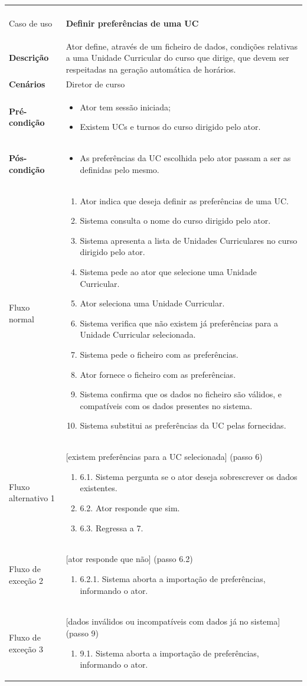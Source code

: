 \documentclass[12pt, a4paper]{article}
\newenvironment{condition}{
    \begin{itemize}[wide=0pt]
        \vspace{-0.2cm}
}{
        \vspace{-0.5cm}
    \end{itemize}
}
\newcommand\flow[1]{
    Fluxo normal &
    \vspace{-0.9cm}
    \singlespacing
    \begin{enumerate}[wide=0pt]
        #1
        \vspace{-0.3cm}
    \end{enumerate} \\ \hline
}
\newcommand\otherflow[3]{
    #1 &
    #2
    \singlespacing
    \begin{enumerate}[wide=0pt]
        #3
        \vspace{-0.3cm}
    \end{enumerate} \\ \hline
}
\newenvironment{usecase}[5]{
    \begin{longtable}{|>{\centering\arraybackslash\bf}m{3cm}|m{13cm}|}
        \multicolumn{2}{c}{\ldots Continua \ldots} \\
        \endfoot
        \endlastfoot

        \hline
        Caso de uso & \textbf{#1} \\

        \hline
        Descrição & #2 \\

        \hline
        Cenários & #3 \\

        \hline
        Pré-condição &
        \vspace{-0.8cm}
        \begin{condition}
            #4
        \end{condition} \\

        \hline
        Pós-condição &
        \vspace{-0.8cm}
        \begin{condition}
            #5
        \end{condition} \\

        \hline
}{
\end{longtable}
}
\begin{document}
\begin{usecase}
    {Definir preferências de uma UC}
    {
        Ator define, através de um ficheiro de dados, condições relativas a uma Unidade Curricular
        do curso que dirige, que devem ser respeitadas na geração automática de horários.
    }
    {Diretor de curso}
    {
        \item Ator tem sessão iniciada;
        \item Existem UCs e turnos do curso dirigido pelo ator.
    }
    {\item As preferências da UC escolhida pelo ator passam a ser as definidas pelo mesmo.}

    \flow{
        \item Ator indica que deseja definir as preferências de uma UC.
        \item Sistema consulta o nome do curso dirigido pelo ator.
        \item Sistema apresenta a lista de Unidades Curriculares no curso dirigido pelo ator.
        \item Sistema pede ao ator que selecione uma Unidade Curricular.
        \item Ator seleciona uma Unidade Curricular.
        \item Sistema verifica que não existem já preferências para a Unidade Curricular
            selecionada.
        \item Sistema pede o ficheiro com as preferências.
        \item Ator fornece o ficheiro com as preferências.
        \item Sistema confirma que os dados no ficheiro são válidos, e compatíveis com os dados
            presentes no sistema.
        \item Sistema substitui as preferências da UC pelas fornecidas.
    }

    \otherflow{Fluxo alternativo 1}{[existem preferências para a UC selecionada] (passo 6)}{
        \item[6.1.] Sistema pergunta se o ator deseja sobrescrever os dados existentes.
        \item[6.2.] Ator responde que sim.
        \item[6.3.] Regressa a 7.
    }

    \otherflow{Fluxo de exceção 2}{[ator responde que não] (passo 6.2)}{
        \item[6.2.1.] Sistema aborta a importação de preferências, informando o ator.
    }

    \otherflow{Fluxo de exceção 3}
        {[dados inválidos ou incompatíveis com dados já no sistema] (passo 9)}{

        \item[9.1.] Sistema aborta a importação de preferências, informando o ator.
    }
\end{usecase}
\end{document}
